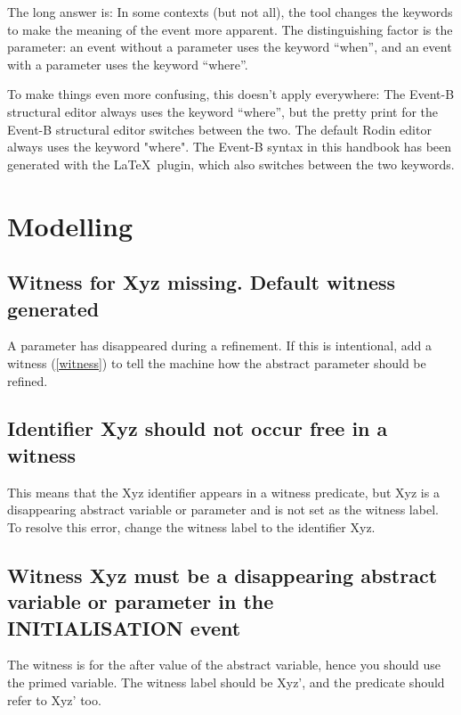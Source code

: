The long answer is: In some contexts (but not all), the tool changes the keywords to make the meaning of the event more apparent.  The distinguishing factor is the parameter: an event without a parameter uses the keyword ``when'', and an event with a parameter uses the keyword ``where''.

To make things even more confusing, this doesn't apply everywhere: The Event-B structural editor always uses the keyword ``where'', but the pretty print for the Event-B structural editor switches between the two.  The default Rodin editor always uses the keyword "where". The Event-B syntax in this handbook has been generated with the \LaTeX\ plugin, which also switches between the two keywords.

\section{Modelling}

\subsection{Witness for \textsf{Xyz} missing. Default witness generated}

A parameter has disappeared during a refinement. If this is intentional, add a witness (\ref{witness}) to tell the machine how the abstract parameter should be refined. 

\subsection{Identifier \textsf{Xyz} should not occur free in a witness}

This means that the \textsf{Xyz} identifier appears in a witness predicate, but \textsf{Xyz} is a disappearing abstract variable or parameter and is not set as the witness label. To resolve this error, change the witness label to the identifier \textsf{Xyz}.

\subsection{Witness \textsf{Xyz} must be a disappearing abstract variable or parameter in the \textsf{INITIALISATION} event}

The witness is for the after value of the abstract variable, hence you should use the primed variable. The witness label should be \textsf{Xyz'}, and the predicate should refer to \textsf{Xyz'} too. 

